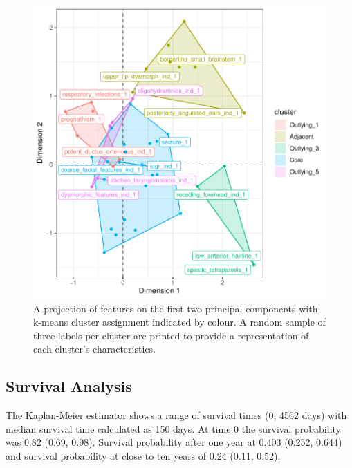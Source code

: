 \documentclass[
  authoryear,
  preprint,
  3p]{elsarticle}
\begin{document}
\begin{figure}

{\centering \includegraphics{paper_files/figure-pdf/fig-clust-1.pdf}

}

\caption{\label{fig-clust}A projection of features on the first two
principal components with k-means cluster assignment indicated by
colour. A random sample of three labels per cluster are printed to
provide a representation of each cluster's characteristics.}

\end{figure}

\hypertarget{survival-analysis-1}{%
\subsection{Survival Analysis}\label{survival-analysis-1}}

The Kaplan-Meier estimator shows a range of survival times (0, 4562
days) with median survival time calculated as 150 days. At time 0 the
survival probability was 0.82 (0.69, 0.98). Survival probability after
one year at 0.403 (0.252, 0.644) and survival probability at close to
ten years of 0.24 (0.11, 0.52).
\end{document}
